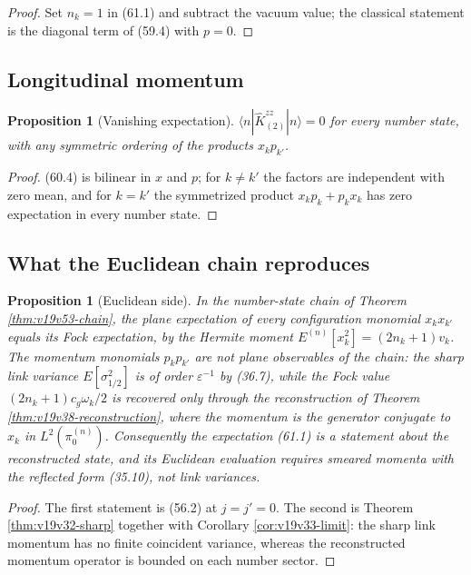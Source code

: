 \documentclass[11pt]{article}
\newtheorem{proposition}[theorem]{Proposition}
\theoremstyle{remark}
\begin{document}
\begin{proof}
Set \(n_k=1\) in (61.1) and subtract the vacuum value; the classical
statement is the diagonal term of (59.4) with \(p=0\).
\end{proof}

\subsection{Longitudinal momentum}

\begin{proposition}[Vanishing expectation]
\label{prop:v19v58-longitudinal}
\(\langle n|\widehat K^{zz}_{(2)}|n\rangle=0\) for every number state,
with any symmetric ordering of the products \(x_kp_{k'}\).
\end{proposition}

\begin{proof}
(60.4) is bilinear in \(x\) and \(p\); for \(k\neq k'\) the factors are
independent with zero mean, and for \(k=k'\) the symmetrized product
\(x_kp_k+p_kx_k\) has zero expectation in every number state.
\end{proof}

\subsection{What the Euclidean chain reproduces}

\begin{proposition}[Euclidean side]
\label{prop:v19v58-euclidean}
In the number-state chain of Theorem \ref{thm:v19v53-chain}, the plane
expectation of every configuration monomial \(x_kx_{k'}\) equals its
Fock expectation, by the Hermite moment
\(E^{(n)}[x_k^2]=(2n_k+1)v_k\).  The momentum monomials \(p_kp_{k'}\)
are not plane observables of the chain: the sharp link variance
\(E[\sigma_{1/2}^2]\) is of order \(\varepsilon^{-1}\) by (36.7), while
the Fock value \((2n_k+1)c_g\omega_k/2\) is recovered only through the
reconstruction of Theorem \ref{thm:v19v38-reconstruction}, where the
momentum is the generator conjugate to \(x_k\) in \(L^2(\pi_0^{(n)})\).
Consequently the expectation (61.1) is a statement about the
reconstructed state, and its Euclidean evaluation requires smeared
momenta with the reflected form (35.10), not link variances.
\end{proposition}

\begin{proof}
The first statement is (56.2) at \(j=j'=0\).  The second is Theorem
\ref{thm:v19v32-sharp} together with Corollary \ref{cor:v19v33-limit}:
the sharp link momentum has no finite coincident variance, whereas the
reconstructed momentum operator is bounded on each number sector.
\end{proof}
\end{document}
